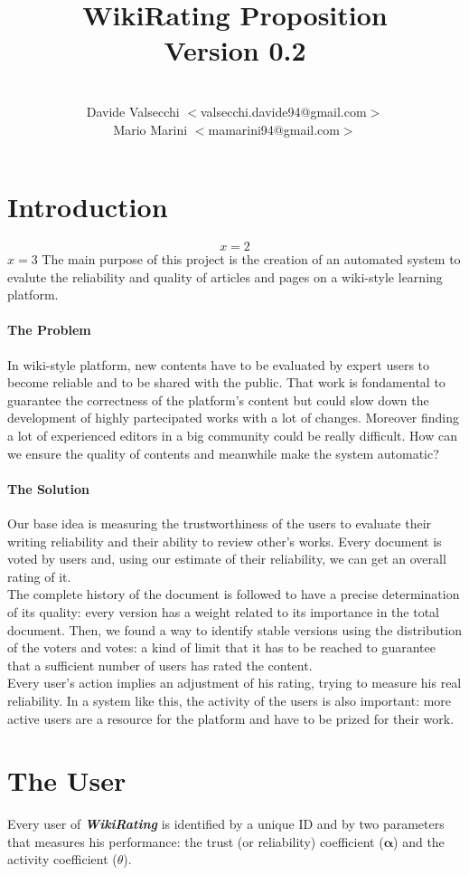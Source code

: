 \documentclass[a4paper,11pt]{article}
\title{\textbf{WikiRating Proposition\\Version 0.2}}
\author{\\Davide Valsecchi $<$valsecchi.davide94@gmail.com$>$
\\Mario Marini $<$mamarini94@gmail.com$>$}
\newcommand{\wir}{\textbf{\textit{WikiRating }}}
\begin{document}
\maketitle
\newpage
\tableofcontents
\newpage

\section{Introduction}

$$x = 2$$
$x=3$
The main purpose of this project is the creation of an automated system to evalute the reliability and quality of articles and pages on a wiki-style learning platform.
\paragraph{The Problem}
In wiki-style platform, new contents have to be evaluated by expert users to become reliable and to be shared with the public. That work is fondamental to guarantee the
correctness of the platform's content but could slow down the development of highly
partecipated works with a lot of changes. Moreover finding a lot of experienced editors  
in a big community could be really difficult. How can we ensure the quality of contents 
and meanwhile make the system automatic?
\paragraph{The Solution}
Our base idea is measuring the trustworthiness of the users to evaluate their writing reliability and their ability to review other's works. Every document is voted by users and, using our estimate of their reliability, we can get an overall rating of it. 
\\The complete history of the document is followed to have a precise determination of its quality: every version has a weight related to its importance in the total document. Then, we found a way to identify stable versions using the distribution of the voters and votes: a kind of limit that it has to be reached to guarantee that a sufficient number of users has rated the content. 
\\Every user's action implies an adjustment of his rating, trying to measure his real reliability. In a system like this, the activity of the users is also important: more active users are a resource for the platform and have to be prized for their work.

\newpage
\section{The User} \label{sec:user}
Every user of \wir is identified by a unique ID and by two parameters that measures his 
performance: the trust (or reliability) coefficient ($\mathbf{\alpha}$) and the activity 
coefficient ($\theta$).
\end{document}
